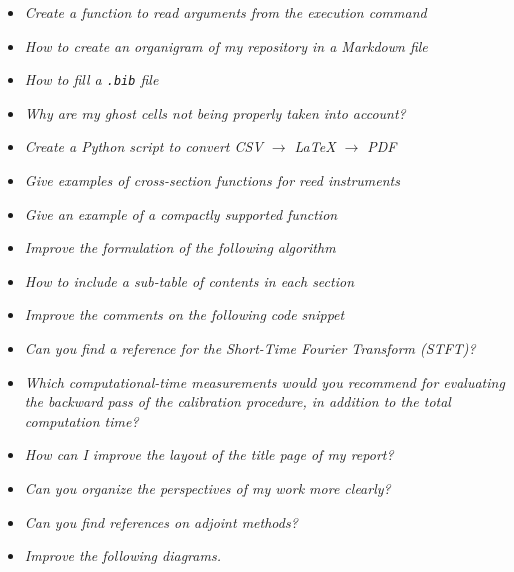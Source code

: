 \documentclass[11pt,a4paper]{report}
\theoremstyle{plain}
\theoremstyle{definition}
\begin{document}
\begin{itemize}

    \item \textit{Create a function to read arguments from the execution command}

    \item \textit{How to create an organigram of my repository in a Markdown file}

    \item \textit{How to fill a \texttt{.bib} file}

    \item \textit{Why are my ghost cells not being properly taken into account?}

    \item \textit{Create a Python script to convert CSV $\rightarrow$ \LaTeX{}
    $\rightarrow$ PDF}

    \item \textit{Give examples of cross-section functions for reed instruments}

    \item \textit{Give an example of a compactly supported function}

    \item \textit{Improve the formulation of the following algorithm}

    \item \textit{How to include a sub-table of contents in each section}

    \item \textit{Improve the comments on the following code snippet}

    \item \textit{Can you find a reference for the Short-Time Fourier Transform
    (STFT)?}

    \item \textit{Which computational-time measurements would you recommend
    for evaluating the backward pass of the calibration procedure, in addition
    to the total computation time?}

    \item \textit{How can I improve the layout of the title page of my report?}

    \item \textit{Can you organize the perspectives of my work more clearly?}

    \item \textit{Can you find references on adjoint methods?}

    \item \textit{Improve the following diagrams.}

\end{itemize}
\end{document}
